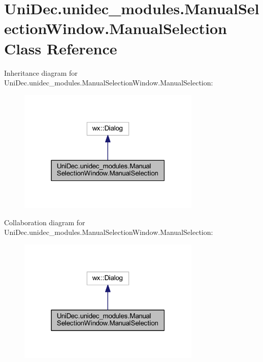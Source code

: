 \hypertarget{class_uni_dec_1_1unidec__modules_1_1_manual_selection_window_1_1_manual_selection}{}\section{Uni\+Dec.\+unidec\+\_\+modules.\+Manual\+Selection\+Window.\+Manual\+Selection Class Reference}
\label{class_uni_dec_1_1unidec__modules_1_1_manual_selection_window_1_1_manual_selection}


Inheritance diagram for Uni\+Dec.\+unidec\+\_\+modules.\+Manual\+Selection\+Window.\+Manual\+Selection\+:\nopagebreak
\begin{figure}[H]
\begin{center}
\leavevmode
\includegraphics[width=247pt]{class_uni_dec_1_1unidec__modules_1_1_manual_selection_window_1_1_manual_selection__inherit__graph}
\end{center}
\end{figure}


Collaboration diagram for Uni\+Dec.\+unidec\+\_\+modules.\+Manual\+Selection\+Window.\+Manual\+Selection\+:\nopagebreak
\begin{figure}[H]
\begin{center}
\leavevmode
\includegraphics[width=247pt]{class_uni_dec_1_1unidec__modules_1_1_manual_selection_window_1_1_manual_selection__coll__graph}
\end{center}
\end{figure}
